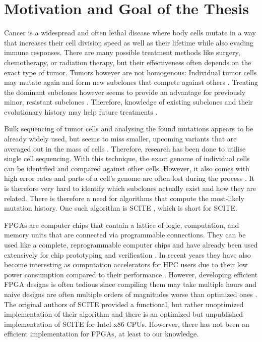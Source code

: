 \section{Motivation and Goal of the Thesis}

Cancer is a widespread and often lethal disease\cite{10.1001/jamaoncol.2021.6987} where body cells mutate in a way that increases their cell division speed as well as their lifetime while also evading immune responses. There are many possible treatment methods like surgery, chemotherapy, or radiation therapy, but their effectiveness often depends on the exact type of tumor. Tumors however are not homogenous: Individual tumor cells may mutate again and form new subclones that compete against others \cite{nik2012life}. Treating the dominant subclones however seems to provide an advantage for previously minor, resistant subclones \cite{gillies2012evolutionary}. Therefore, knowledge of existing subclones and their evolutionary history may help future treatments \cite{greaves2012clonal}\cite{stratton2009cancer}\cite{swanton2012intratumor}.

Bulk sequencing of tumor cells and analysing the found mutations appears to be already widely used, but seems to miss smaller, upcoming variants that are averaged out in the mass of cells \cite{navin2014cancer}. Therefore, research has been done to utilise single cell sequencing. With this technique, the exact genome of individual cells can be identified and compared against other cells. However, it also comes with high error rates and parts of a cell's genome are often lost during the process \cite{tree2016}. It is therefore very hard to identify which subclones actually exist and how they are related. There is therefore a need for algorithms that compute the most-likely mutation history. One such algorithm is \acs{SCITE} \cite{tree2016}, which is short for \acl{SCITE}.

\acp{FPGA} are computer chips that contain a lattice of logic, computation, and memory units that are connected via programmable connections. They can be used like a complete, reprogrammable computer chips and have already been used extensively for chip prototyping and verification \cite{rodriguez2007features}. In recent years they have also become interesting as computation accelerators for \ac{HPC} users due to their low power consumption compared to their performance \cite{betkaoui2010comparing}. However, developing efficient \ac{FPGA} designs is often tedious since compiling them may take multiple hours and naive designs are often multiple orders of magnitudes worse than optimized ones \cite{betkaoui2010comparing}. The original authors of \ac{SCITE} provided a functional, but rather unoptimized implementation of their algorithm and there is an optimized but unpublished implementation of \ac{SCITE} for Intel x86 CPUs. Howerver, there has not been an efficient implementation for \acp{FPGA}, at least to our knowledge.

